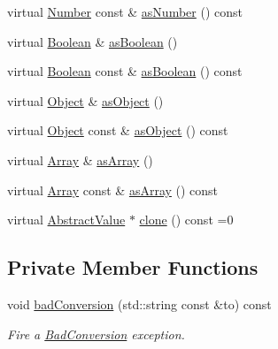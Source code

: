 \begin{DoxyCompactItemize}
\item 
virtual \hyperlink{classj_1_1impl_1_1_number}{Number} const \& \hyperlink{classj_1_1impl_1_1_abstract_value_a7b6246ea9bae83667abdbd7f58ece885}{as\-Number} () const 
\item 
virtual \hyperlink{classj_1_1impl_1_1_boolean}{Boolean} \& \hyperlink{classj_1_1impl_1_1_abstract_value_ae658e600ec0589f3a632a803fa390ad4}{as\-Boolean} ()
\item 
virtual \hyperlink{classj_1_1impl_1_1_boolean}{Boolean} const \& \hyperlink{classj_1_1impl_1_1_abstract_value_a19f38830cc9b55aa22c5eb41868b56c2}{as\-Boolean} () const 
\item 
virtual \hyperlink{classj_1_1impl_1_1_object}{Object} \& \hyperlink{classj_1_1impl_1_1_abstract_value_ab692a8f260c4f0cf45ef0b7cc13ade66}{as\-Object} ()
\item 
virtual \hyperlink{classj_1_1impl_1_1_object}{Object} const \& \hyperlink{classj_1_1impl_1_1_abstract_value_a99b098127ffda123446643bef12f574b}{as\-Object} () const 
\item 
virtual \hyperlink{classj_1_1impl_1_1_array}{Array} \& \hyperlink{classj_1_1impl_1_1_abstract_value_afd41265b99a6e385f3d3cb9679d864ab}{as\-Array} ()
\item 
virtual \hyperlink{classj_1_1impl_1_1_array}{Array} const \& \hyperlink{classj_1_1impl_1_1_abstract_value_ab9a29818092145c446517dda40e52b46}{as\-Array} () const 
\item 
virtual \hyperlink{classj_1_1impl_1_1_abstract_value}{Abstract\-Value} $\ast$ \hyperlink{classj_1_1impl_1_1_abstract_value_ac61a9aa4a4ecd3a309e8e274ac4b3dd2}{clone} () const =0
\end{DoxyCompactItemize}
\subsection*{Private Member Functions}
\begin{DoxyCompactItemize}
\item 
void \hyperlink{classj_1_1impl_1_1_abstract_value_a8844e3910ff499d9c8b96886beddbc53}{bad\-Conversion} (std\-::string const \&to) const 
\begin{DoxyCompactList}\small\item\em Fire a \hyperlink{classj_1_1_bad_conversion}{Bad\-Conversion} exception. \end{DoxyCompactList}\end{DoxyCompactItemize}


